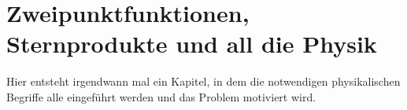 
\section{Zweipunktfunktionen, Sternprodukte und all die Physik} %
\label{sec:zweipunktfunktionen_sternprodukte_und_all_die_physik}

	

Hier entsteht irgendwann mal ein Kapitel, in dem die notwendigen physikalischen Begriffe alle eingeführt werden und das Problem motiviert wird.

